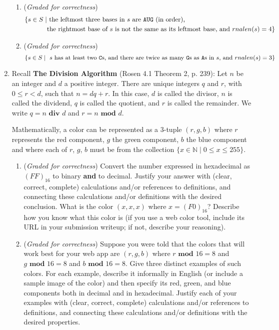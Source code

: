 \documentclass[12pt, oneside]{article}
\begin{document}
\begin{enumerate}
\begin{enumerate}
\item ({\it Graded for correctness})\begin{align*}
\{ s \in S \mid &\text{ the leftmost three bases in $s$ are $\texttt{A}\texttt{U}\texttt{G}$ (in order),}\\
&\text{the rightmost base of $s$ is not the same as its leftmost base, and $rnalen(s) = 4$} \}
\end{align*}

\item ({\it Graded for correctness})
\[
\{ s \in S \mid \text{ $s$ has at least two $\texttt{C}$s, and there are twice as many $\texttt{G}$s as $\texttt{A}$s in $s$, and $rnalen(s) = 3$} \}
\]
\end{enumerate}

\item Recall {\bf The Division Algorithm} (Rosen 4.1 Theorem 2, p. 239):
 Let $n$ be an integer 
and $d$ a positive integer. There are unique integers $q$ and $r$, with $0 \leq r < d$, such that 
$n = dq + r$. In this case, $d$ is called the divisor, $n$ is called the dividend, $q$ is called the quotient, 
and $r$ is called the remainder. We write $q=n \textbf{ div } d$ and $r=n \textbf{ mod } d$.

Mathematically, a color can be represented as a $3$-tuple $(r, g, b)$ where $r$
represents the red component, $g$ the green component, $b$ the blue component and where each of $r$, $g$, $b$ must be from the collection $\{x \in \mathbb{N}\mid 0 \leq x \leq 255 \}$.

\begin{enumerate}
\item  ({\it Graded for correctness}) Convert the number expressed in hexadecimal as $(FF)_{16}$ to binary {\bf and} to decimal.
Justify your answer
with (clear, correct, complete) calculations and/or references to definitions, and connecting these
calculations and/or definitions with
the desired conclusion.
What is the color $(x,x,x)$ where $x = (F0)_{16}$? Describe how you know what this color is 
(if you use a web color tool, include its URL in your submission writeup; if not, describe your reasoning).


\item  ({\it Graded for correctness}) Suppose you were told that the colors that will work best for your web app are $(r,g,b)$ where $r \textbf{ mod } 16 = 8$ and $g \textbf{ mod } 16 = 8$
and $b \textbf{ mod } 16 = 8$.  Give three distinct examples of such colors.
For each example, describe it informally in English (or include a sample image of the color) and then specify its 
red, green, and blue components both in decimal and in hexadecimal.  
Justify each of your examples
with (clear, correct, complete) calculations and/or references to definitions, and connecting these
calculations and/or definitions with
the desired properties.
\end{enumerate}



\end{enumerate}
\end{document}
